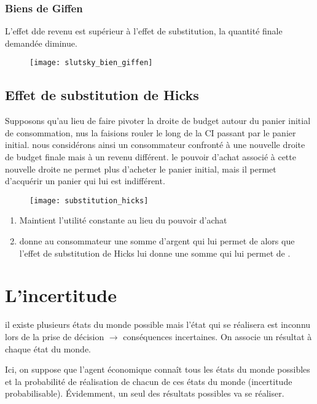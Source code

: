 \subsubsection{Biens de Giffen}
L'effet dde revenu est supérieur à l'effet de substitution, la quantité finale demandée diminue.
\begin{figure}[H]
	\centering
	\texttt{[image: slutsky\_bien\_giffen]}
\end{figure}

\subsection{Effet de substitution de Hicks}
Supposons qu'au lieu de faire pivoter la droite de budget autour du panier initial de consommation, nus la faisions rouler le long de la CI passant par le panier initial. nous considérons ainsi un consommateur confronté à une nouvelle droite de budget finale mais à un revenu différent. le pouvoir d'achat associé à cette nouvelle droite ne permet plus d'acheter le panier initial, mais il permet d'acquérir un panier qui lui est indifférent.

\begin{figure}[H]
	\centering
	\texttt{[image: substitution\_hicks]}
\end{figure}

\begin{enumerate}
\item Maintient l'utilité constante au lieu du pouvoir d'achat
\item {} donne au consommateur une somme d'argent qui lui permet de  alors que l'effet de substitution de Hicks lui donne une somme qui lui permet de .
\end{enumerate}

\section{L'incertitude}

il existe plusieurs états du monde possible mais l'état qui se réalisera est inconnu lors de la prise de décision $\rightarrow$ conséquences incertaines. On associe un résultat à chaque état du monde.

Ici, on suppose que l'agent économique connaît tous les états du monde possibles et la probabilité de réalisation de chacun de ces états du monde (incertitude probabilisable). Évidemment, un seul des résultats possibles va se réaliser.

